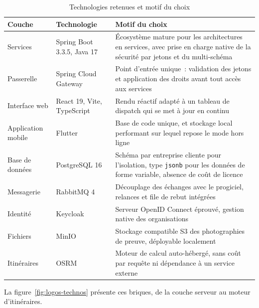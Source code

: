 \begin{table}[H]
\centering
\caption{Technologies retenues et motif du choix}
\label{tab:technos}
\begin{tabular}{L{2.5cm}L{3.4cm}L{8.6cm}}
\hline
{}
\textbf{Couche} & \textbf{Technologie} & \textbf{Motif du choix} \\
\hline
Services & Spring Boot 3.3.5, Java 17 & Écosystème mature pour les architectures en services, avec
prise en charge native de la sécurité par jetons et du multi-schéma \\
\hline
Passerelle & Spring Cloud Gateway & Point d'entrée unique~: validation des jetons et application des
droits avant tout accès aux services \\
\hline
Interface web & React 19, Vite, TypeScript & Rendu réactif adapté à un tableau de dispatch qui se met
à jour en continu \\
\hline
Application mobile & Flutter & Base de code unique, et stockage local performant sur lequel repose le
mode hors ligne \\
\hline
Base de données & PostgreSQL 16 & Schéma par entreprise cliente pour l'isolation, type
\texttt{jsonb} pour les données de forme variable, absence de coût de licence \\
\hline
Messagerie & RabbitMQ 4 & Découplage des échanges avec le progiciel, relances et file de rebut
intégrées \\
\hline
Identité & Keycloak & Serveur OpenID Connect éprouvé, gestion native des organisations \\
\hline
Fichiers & MinIO & Stockage compatible S3 des photographies de preuve, déployable localement \\
\hline
Itinéraires & OSRM & Moteur de calcul auto-hébergé, sans coût par requête ni dépendance à un service
externe \\
\hline
\end{tabular}
\end{table}

La figure~\ref{fig:logos-technos} présente ces briques, de la couche serveur au moteur
d'itinéraires.

